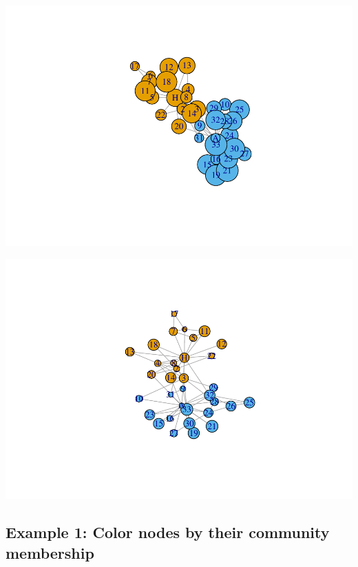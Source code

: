 \documentclass[
]{book}
\newenvironment{Shaded}{\begin{snugshade}}{\end{snugshade}}
\newcommand{\AttributeTok}[1]{\textcolor[rgb]{0.13,0.29,0.53}{#1}}
\newcommand{\CommentTok}[1]{\textcolor[rgb]{0.56,0.35,0.01}{\textit{#1}}}
\newcommand{\FloatTok}[1]{\textcolor[rgb]{0.00,0.00,0.81}{#1}}
\newcommand{\FunctionTok}[1]{\textcolor[rgb]{0.13,0.29,0.53}{\textbf{#1}}}
\newcommand{\NormalTok}[1]{#1}
\newcommand{\SpecialCharTok}[1]{\textcolor[rgb]{0.81,0.36,0.00}{\textbf{#1}}}
\begin{document}
\includegraphics{bookdown-demo_files/figure-latex/unnamed-chunk-181-1.pdf}

\begin{Shaded}
\end{Shaded}

\includegraphics{bookdown-demo_files/figure-latex/unnamed-chunk-181-2.pdf}

\subsection{Example 1: Color nodes by their community membership}\label{example-1-color-nodes-by-their-community-membership}
\end{document}
